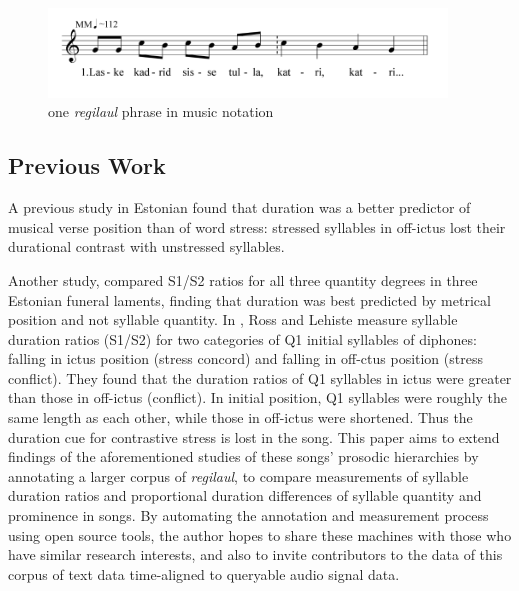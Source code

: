 \documentclass[12pt]{article}
\begin{document}
 
 \begin{figure}[htbp]
\begin{center}
\includegraphics[width=300pt]{melody.png}
\caption{one {\it regilaul} phrase in music notation}
\label{default}
\end{center}
\end{figure}




\subsection*{Previous Work}


  A previous study in Estonian \cite{rossTradeoffQuantityStress1996} found that duration was a better predictor of musical verse position than of word stress: stressed syllables in off-ictus lost their durational contrast with unstressed syllables.


 Another study, \cite{rossLostProsodicOppositions1994} compared S1/S2 ratios for all three quantity degrees in three Estonian funeral laments, finding that duration was best predicted by metrical position and not syllable quantity. 
In \cite{rossTimingEstonianFolk1998, rossTradeoffQuantityStress1996}, Ross and Lehiste measure syllable duration ratios (S1/S2) for two categories of Q1 initial syllables of diphones: falling in ictus position (stress concord) and falling in off-ctus position (stress conflict). They found that the duration ratios of Q1 syllables in ictus were greater than those in off-ictus (conflict). In initial position, Q1 syllables were roughly the same length as each other, while those in off-ictus were shortened. Thus the duration cue for contrastive stress is lost in the song. 
This paper aims to extend findings of the aforementioned studies of these songs' prosodic hierarchies by annotating a larger corpus of {\it regilaul}, to compare measurements of syllable duration ratios and proportional duration differences of syllable quantity and prominence in songs. By automating the annotation and measurement process using open source tools, the author hopes to share these machines with those who have similar research interests, and also to invite contributors to the data of this corpus of text data time-aligned to queryable audio signal data.  
\end{document}
